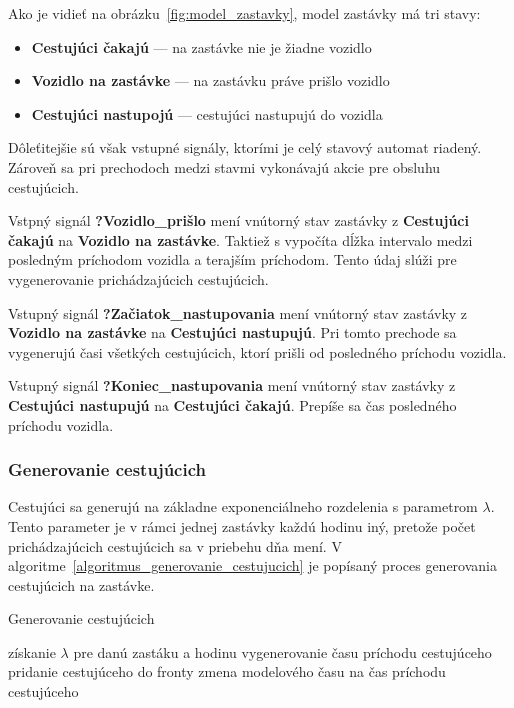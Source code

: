 Ako je vidieť na obrázku~\ref{fig:model_zastavky}, model zastávky má tri stavy:
\begin{itemize}
  \item \textbf{Cestujúci čakajú} --- na zastávke nie je žiadne vozidlo
  \item \textbf{Vozidlo na zastávke} --- na zastávku práve prišlo vozidlo
  \item \textbf{Cestujúci nastupojú} --- cestujúci nastupujú do vozidla
\end{itemize}

Dôleťitejšie sú však vstupné signály, ktorími je celý stavový automat riadený.
Zároveň sa pri prechodoch medzi stavmi vykonávajú akcie pre obsluhu cestujúcich.

Vstpný signál \textbf{?Vozidlo\_prišlo} mení vnútorný stav zastávky z \textbf{Cestujúci čakajú} na \textbf{Vozidlo na zastávke}.
Taktiež s vypočíta dĺžka intervalo medzi posledným príchodom vozidla a terajším príchodom.
Tento údaj slúži pre vygenerovanie prichádzajúcich cestujúcich.

Vstupný signál \textbf{?Začiatok\_nastupovania} mení vnútorný stav zastávky z \textbf{Vozidlo na zastávke} na \textbf{Cestujúci nastupujú}.
Pri tomto prechode sa vygenerujú časi všetkých cestujúcich, ktorí prišli od posledného príchodu vozidla.

Vstupný signál \textbf{?Koniec\_nastupovania} mení vnútorný stav zastávky z \textbf{Cestujúci nastupujú} na \textbf{Cestujúci čakajú}.
Prepíše sa čas posledného príchodu vozidla.

\subsubsection{Generovanie cestujúcich}

Cestujúci sa generujú na základne exponenciálneho rozdelenia s parametrom $\lambda$.
Tento parameter je v rámci jednej zastávky každú hodinu iný, pretože počet prichádzajúcich cestujúcich sa v priebehu dňa mení.
V algoritme~\ref{algoritmus_generovanie_cestujucich} je popísaný proces generovania cestujúcich na zastávke.

\vspace*{\dimexpr0.5\baselineskip\relax}
\begin{algorithm}[H]\label{algoritmus_generovanie_cestujucich}
\caption{Generovanie cestujúcich}
  získanie $\lambda$ pre danú zastáku a hodinu\;
   {
    vygenerovanie času príchodu cestujúceho\;
    pridanie cestujúceho do fronty\;
    zmena modelového času na čas príchodu cestujúceho\;
  }
\end{algorithm}

